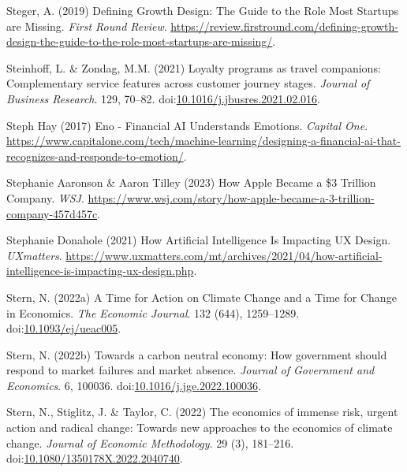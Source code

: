 \documentclass[
  letterpaper,
  DIV=11,
  numbers=noendperiod]{scrartcl}
\newlength{\cslhangindent}
\newenvironment{CSLReferences}[2] %
 {\begin{list}{}{%
  \setlength{\itemindent}{0pt}
  \setlength{\leftmargin}{0pt}
  \setlength{\parsep}{0pt}
  \ifodd #1
   \setlength{\leftmargin}{\cslhangindent}
   \setlength{\itemindent}{-1\cslhangindent}
  \fi
  \setlength{\itemsep}{#2\baselineskip}}}
 {\end{list}}
\begin{document}
\begin{CSLReferences}{0}{1}
Steger, A. (2019) Defining {Growth Design}: {The Guide} to the {Role
Most Startups} are {Missing}. \emph{First Round Review}.
\url{https://review.firstround.com/defining-growth-design-the-guide-to-the-role-most-startups-are-missing/}.

Steinhoff, L. \& Zondag, M.M. (2021) Loyalty programs as travel
companions: {Complementary} service features across customer journey
stages. \emph{Journal of Business Research}. 129, 70--82.
doi:\href{https://doi.org/10.1016/j.jbusres.2021.02.016}{10.1016/j.jbusres.2021.02.016}.

Steph Hay (2017) Eno - {Financial AI Understands Emotions}.
\emph{Capital One}.
\url{https://www.capitalone.com/tech/machine-learning/designing-a-financial-ai-that-recognizes-and-responds-to-emotion/}.

Stephanie Aaronson \& Aaron Tilley (2023) How {Apple Became} a \$3
{Trillion Company}. \emph{WSJ}.
\url{https://www.wsj.com/story/how-apple-became-a-3-trillion-company-457d457c}.

Stephanie Donahole (2021) How {Artificial Intelligence Is Impacting UX
Design}. \emph{UXmatters}.
\url{https://www.uxmatters.com/mt/archives/2021/04/how-artificial-intelligence-is-impacting-ux-design.php}.

Stern, N. (2022a) A {Time} for {Action} on {Climate Change} and a {Time}
for {Change} in {Economics}. \emph{The Economic Journal}. 132 (644),
1259--1289.
doi:\href{https://doi.org/10.1093/ej/ueac005}{10.1093/ej/ueac005}.

Stern, N. (2022b) Towards a carbon neutral economy: {How} government
should respond to market failures and market absence. \emph{Journal of
Government and Economics}. 6, 100036.
doi:\href{https://doi.org/10.1016/j.jge.2022.100036}{10.1016/j.jge.2022.100036}.

Stern, N., Stiglitz, J. \& Taylor, C. (2022) The economics of immense
risk, urgent action and radical change: Towards new approaches to the
economics of climate change. \emph{Journal of Economic Methodology}. 29
(3), 181--216.
doi:\href{https://doi.org/10.1080/1350178X.2022.2040740}{10.1080/1350178X.2022.2040740}.


\end{CSLReferences}
\end{document}
